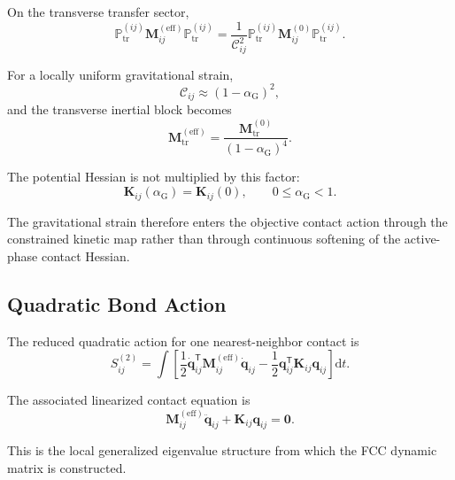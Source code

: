 On the transverse transfer sector,
\begin{equation}
    \boxed{ \mathbb{P}_{\mathrm{tr}}^{(ij)} \mathbf{M}_{ij}^{(\mathrm{eff})} \mathbb{P}_{\mathrm{tr}}^{(ij)} = \frac{1}{\mathcal{C}_{ij}^2} \mathbb{P}_{\mathrm{tr}}^{(ij)} \mathbf{M}_{ij}^{(0)} \mathbb{P}_{\mathrm{tr}}^{(ij)} }.
\end{equation}

For a locally uniform gravitational strain,
\begin{equation}
    \mathcal{C}_{ij} \approx \left( 1-\alpha_{\mathrm{G}} \right)^2,
\end{equation}
and the transverse inertial block becomes
\begin{equation}
    \boxed{ \mathbf{M}_{\mathrm{tr}}^{(\mathrm{eff})} = \frac{ \mathbf{M}_{\mathrm{tr}}^{(0)} }{ \left( 1-\alpha_{\mathrm{G}} \right)^4 } }.
\end{equation}

The potential Hessian is not multiplied by this factor:
\begin{equation}
    \boxed{ \mathbf{K}_{ij}(\alpha_{\mathrm{G}}) = \mathbf{K}_{ij}(0) }, \qquad 0 \leq \alpha_{\mathrm{G}} < 1.
\end{equation}

The gravitational strain therefore enters the objective contact action through the constrained kinetic map rather than through continuous softening of the active-phase contact Hessian.

\subsection{Quadratic Bond Action}

The reduced quadratic action for one nearest-neighbor contact is
\begin{equation}
    \boxed{ S_{ij}^{(2)} = \int \left[ \frac{1}{2} \dot{\mathbf{q}}_{ij}^{\mathsf{T}} \mathbf{M}_{ij}^{(\mathrm{eff})} \dot{\mathbf{q}}_{ij} - \frac{1}{2} \mathbf{q}_{ij}^{\mathsf{T}} \mathbf{K}_{ij} \mathbf{q}_{ij} \right] \mathrm{d}t }.
\end{equation}

The associated linearized contact equation is
\begin{equation}
    \boxed{ \mathbf{M}_{ij}^{(\mathrm{eff})} \ddot{\mathbf{q}}_{ij} + \mathbf{K}_{ij} \mathbf{q}_{ij} = \mathbf{0} }.
\end{equation}

This is the local generalized eigenvalue structure from which the FCC dynamic matrix is constructed.

